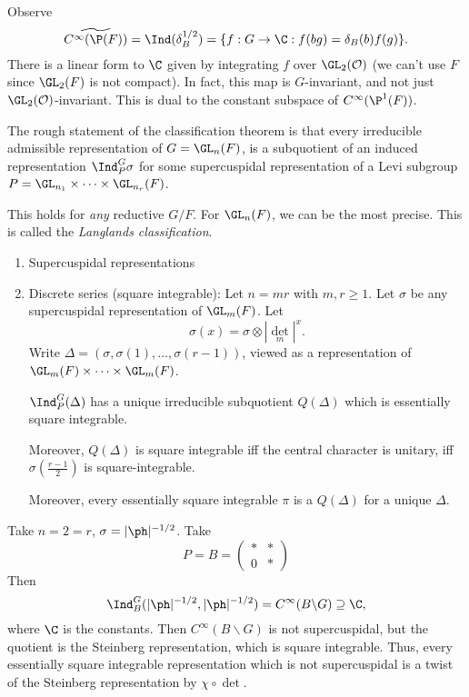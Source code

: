 \documentclass[a4paper]{article}
\begin{document}
\begin{eg}
  Observe
  \[
    \widetilde{C^\infty(\P(F))} = \Ind(\delta_B^{1/2}) = \{f: G \to \C: f(bg) = \delta_B(b) f(g)\}.
  \]
  There is a linear form to $\C$ given by integrating $f$ over $\GL_2(\mathcal{O})$ (we can't use $F$ since $\GL_2(F)$ is not compact). In fact, this map is $G$-invariant, and not just $\GL_2(\mathcal{O})$-invariant. This is dual to the constant subspace of $C^\infty(\P^1(F))$.
\end{eg}

The rough statement of the classification theorem is that every irreducible admissible representation of $G = \GL_n(F)$, is a subquotient of an induced representation $\Ind_P^G \sigma$ for some supercuspidal representation of a Levi subgroup $P = \GL_{n_1} \times \cdots \times \GL_{n_r}(F)$.

This holds for \emph{any} reductive $G/F$. For $\GL_n(F)$, we can be the most precise. This is called the \emph{Langlands classification}.
\begin{enumerate}
  \item Supercuspidal representations
  \item Discrete series (square integrable): Let $n = mr$ with $m, r \geq 1$. Let $\sigma$ be any supercuspidal representation of $\GL_m(F)$. Let
    \[
      \sigma(x) = \sigma \otimes |\det_m|^x.
    \]
    Write $\Delta = (\sigma, \sigma(1), \ldots, \sigma(r - 1))$, viewed as a representation of $\GL_m(F) \times \cdots \times \GL_m(F)$.
    \begin{thm}
      $\Ind_P^G(\Delta)$ has a unique irreducible subquotient $Q(\Delta)$ which is essentially square integrable.

      Moreover, $Q(\Delta)$ is square integrable iff the central character is unitary, iff $\sigma(\frac{r - 1}{2})$ is square-integrable.

      Moreover, every essentially square integrable $\pi$ is a $Q(\Delta)$ for a unique $\Delta$.
    \end{thm}
\end{enumerate}

\begin{eg}
  Take $n = 2 = r$, $\sigma = |\ph|^{-1/2}$. Take
  \[
    P = B =
    \begin{pmatrix}
      * & *\\
      0 & *
    \end{pmatrix}
  \]
  Then
  \[
    \Ind_B^G(|\ph|^{-1/2}, |\ph|^{-1/2}) = C^\infty(B \backslash G) \supseteq \C,
  \]
  where $\C$ is the constants. Then $C^\infty(B\backslash G)$ is not supercuspidal, but the quotient is the Steinberg representation, which is square integrable. Thus, every essentially square integrable representation which is not supercuspidal is a twist of the Steinberg representation by $\chi \circ \det$.
\end{eg}
\end{document}
